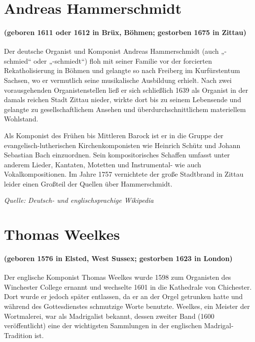 \documentclass[11pt, ngermanm, titlepage]{article}
\begin{document}
	\begin{multicols}{2}
	\section*{Andreas Hammerschmidt}
	\paragraph{(geboren 1611 oder 1612 in Brüx, Böhmen; gestorben 1675 in Zittau)\newline}
	Der deutsche Organist und Komponist Andreas Hammerschmidt (auch „-schmied“ oder „-schmiedt“) floh mit seiner Familie vor der forcierten Rekatholisierung in Böhmen und gelangte so nach Freiberg im Kurfürstentum Sachsen, wo er vermutlich seine musikalische Ausbildung erhielt. Nach zwei vorausgehenden Organistenstellen ließ er sich schließlich 1639 als Organist in der damals reichen Stadt Zittau nieder, wirkte dort bis zu seinem Lebensende und gelangte zu gesellschaftlichem Ansehen und überdurchschnittlichem materiellem Wohlstand.
	
	Als Komponist des Frühen bis Mittleren Barock ist er in die Gruppe der evangelisch-lutherischen Kirchenkomponisten wie Heinrich Schütz und Johann Sebastian Bach einzuordnen. Sein kompositorisches Schaffen umfasst unter anderem Lieder, Kantaten, Motetten und Instrumental- wie auch Vokalkompositionen. Im Jahre 1757 vernichtete der große Stadtbrand in Zittau leider einen Großteil der Quellen über Hammerschmidt.
	
	\textit{Quelle: Deutsch- und englischsprachige Wikipedia}

	
	\section*{Thomas Weelkes}
	\paragraph{(geboren 1576 in Elsted, West Sussex; gestorben 1623 in London)\newline}
	Der englische Komponist Thomas Weelkes wurde 1598 zum Organisten des Winchester College ernannt und wechselte 1601 in die Kathedrale von Chichester. Dort wurde er jedoch später entlassen, da er an der Orgel getrunken hatte und während des Gottesdienstes schmutzige Worte benutzte. Weelkes, ein Meister der Wortmalerei, war als Madrigalist bekannt, dessen zweiter Band (1600 veröffentlicht) eine der wichtigsten Sammlungen in der englischen Madrigal-Tradition ist.


\end{multicols}
\end{document}
